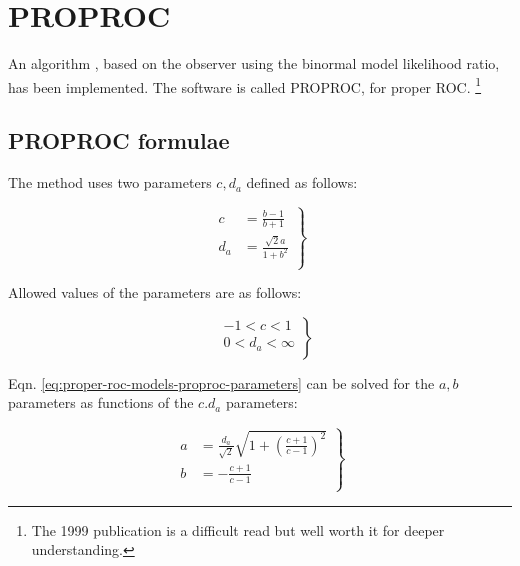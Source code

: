 \documentclass[
]{book}
\begin{document}
\hypertarget{proper-roc-models-proproc}{%
\section{PROPROC}\label{proper-roc-models-proproc}}

An algorithm \citep{metz1999proper}, based on the observer using the binormal model likelihood ratio, has been implemented. The software is called PROPROC, for proper ROC. \footnote{The 1999 publication is a difficult read but well worth it for deeper understanding.}

\hypertarget{proper-roc-models-proproc-formulae}{%
\subsection{PROPROC formulae}\label{proper-roc-models-proproc-formulae}}

The method uses two parameters \(c,d_a\) defined as follows:

\begin{equation} 
\left.\begin{aligned}
c &= \frac{b-1}{b+1} \\
d_a &= \frac{\sqrt{2}a}{1+b^2} \\
\end{aligned}\right\}
\label{eq:proper-roc-models-proproc-parameters}
\end{equation}

Allowed values of the parameters are as follows:

\begin{equation} 
\left.\begin{aligned}
& -1 < c < 1 \\
& 0 < d_a < \infty \\
\end{aligned}\right\}
\label{eq:proper-roc-models-proproc-parameter-ranges}
\end{equation}

Eqn. \eqref{eq:proper-roc-models-proproc-parameters} can be solved for the \(a,b\) parameters as functions of the \(c.d_a\) parameters:

\begin{equation} 
\left.\begin{aligned}
a &= \frac{d_a}{\sqrt{2}}\sqrt{1+{{\left( \frac{c+1}{c-1} \right)^2}}} \\
b &= -\frac{c+1}{c-1} \\
\end{aligned}\right\}
\label{eq:proper-roc-models-proproc-parameters-transform}
\end{equation}
\end{document}
